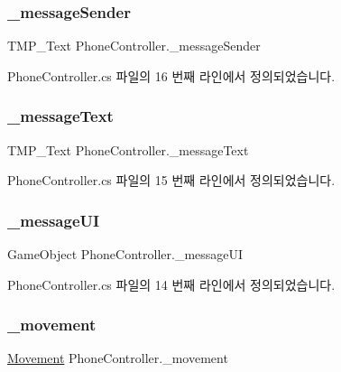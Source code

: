 \subsubsection{\texorpdfstring{\_messageSender}{\_messageSender}}
{\footnotesize\ttfamily T\+M\+P\+\_\+\+Text Phone\+Controller.\+\_\+message\+Sender}



Phone\+Controller.\+cs 파일의 16 번째 라인에서 정의되었습니다.

\mbox{\label{class_phone_controller_a0ed3e219aab6580a863eecf02d7b1445}} 
\subsubsection{\texorpdfstring{\_messageText}{\_messageText}}
{\footnotesize\ttfamily T\+M\+P\+\_\+\+Text Phone\+Controller.\+\_\+message\+Text}



Phone\+Controller.\+cs 파일의 15 번째 라인에서 정의되었습니다.

\mbox{\label{class_phone_controller_a8811f718e73a667a613b36eb5c9adeb4}} 
\subsubsection{\texorpdfstring{\_messageUI}{\_messageUI}}
{\footnotesize\ttfamily Game\+Object Phone\+Controller.\+\_\+message\+UI}



Phone\+Controller.\+cs 파일의 14 번째 라인에서 정의되었습니다.

\mbox{\label{class_phone_controller_a84eaea2042a921af0db16b3f1ea5229c}} 
\subsubsection{\texorpdfstring{\_movement}{\_movement}}
{\footnotesize\ttfamily \mbox{\hyperlink{class_movement}{Movement}} Phone\+Controller.\+\_\+movement\hspace{0.3cm}{\ttfamily [private]}}



